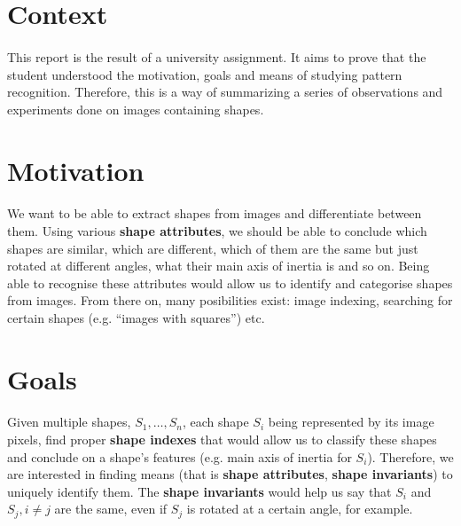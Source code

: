 \section{Context}
\paragraph{}
This report is the result of a university assignment. It aims to prove that the student understood the motivation, goals and means of studying pattern recognition. Therefore, this is a way of summarizing a series of observations and experiments done on images containing shapes.

\section{Motivation}
\paragraph{}
We want to be able to extract shapes from images and differentiate between them. Using various \textbf{shape attributes}, we should be able to conclude which shapes are similar, which are different, which of them are the same but just rotated at different angles, what their main axis of inertia is and so on. Being able to recognise these attributes would allow us to identify and categorise shapes from images. From there on, many posibilities exist: image indexing, searching for certain shapes (e.g. ``images with squares'') etc.


\section{Goals}
\paragraph{}
Given multiple shapes, $S_1, \dots, S_n$, each shape $S_i$ being represented by its image pixels, find proper \textbf{shape indexes} that would allow us to classify these shapes and conclude on a shape's features (e.g. main axis of inertia for $S_i$). Therefore, we are interested in finding means (that is \textbf{shape attributes}, \textbf{shape invariants}) to uniquely identify them. The \textbf{shape invariants} would help us say that $S_i$ and $S_j, i \neq j$ are the same, even if $S_j$ is rotated at a certain angle, for example.
